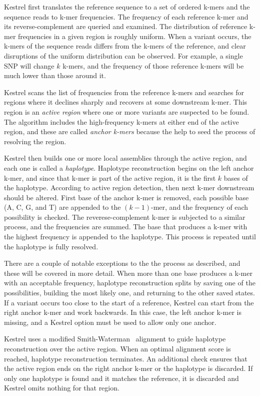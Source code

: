 Kestrel first translates the reference sequence to a set of ordered k-mers and the sequence reads to k-mer frequencies. The frequency of each reference k-mer and its reverse-complement are queried and examined. The distribution of reference k-mer frequencies in a given region is roughly uniform. When a variant occurs, the k-mers of the sequence reads differs from the k-mers of the reference, and clear disruptions of the uniform distribution can be observed. For example, a single SNP will change $k$ k-mers, and the frequency of those reference k-mers will be much lower than those around it.

Kestrel scans the list of frequencies from the reference k-mers and searches for regions where it declines sharply and recovers at some downstream k-mer. This region is an \textit{active region} where one or more variants are suspected to be found. The algorithm includes the high-frequency k-mers at either end of the active region, and these are called \textit{anchor k-mers} because the help to seed the process of resolving the region.

Kestrel then builds one or more local assemblies through the active region, and each one is called a \textit{haplotype}. Haplotype reconstruction begins on the left anchor k-mer, and since that k-mer is part of the active region, it is the first $k$ bases of the haplotype. According to active region detection, then next k-mer downstream should be altered. First base of the anchor k-mer is removed, each possible base (A, C, G, and T) are appended to the $(k - 1)$-mer, and the frequency of each possibility is checked. The reverese-complement k-mer is subjected to a similar process, and the frequencies are summed. The base that produces a k-mer with the highest frequency is appended to the haplotype. This process is repeated until the haplotype is fully resolved.

There are a couple of notable exceptions to the the process as described, and these will be covered in more detail. When more than one base produces a k-mer with an acceptable frequency, haplotype reconstruction splits by saving one of the possibilities, building the most likely one, and returning to the other saved states. If a variant occurs too close to the start of a reference, Kestrel can start from the right anchor k-mer and work backwards. In this case, the left anchor k-mer is missing, and a Kestrel option must be used to allow only one anchor.

Kestrel uses a modified Smith-Waterman~\cite{Smith1981} alignment to guide haplotype reconstruction over the active region. When an optimal alignment score is reached, haplotype reconstruction terminates. An additional check ensures that the active region ends on the right anchor k-mer or the haplotype is discarded. If only one haplotype is found and it matches the reference, it is discarded and Kestrel omits nothing for that region.

